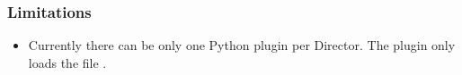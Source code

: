 \subsubsection*{Limitations}

\begin{itemize}
    \item Currently there can be only one Python plugin per Director. The plugin only loads the file .
\end{itemize}
